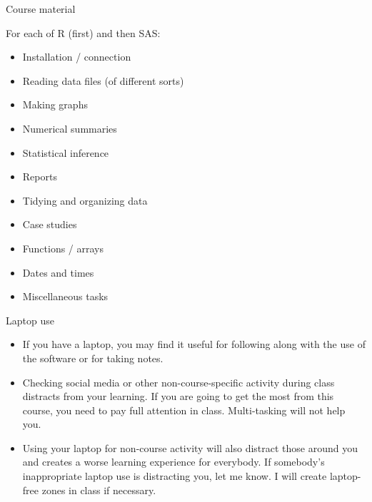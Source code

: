 \documentclass[ignorenonframetext,]{beamer}
\providecommand{\tightlist}{%
  \setlength{\itemsep}{0pt}\setlength{\parskip}{0pt}}
\begin{document}
\begin{frame}{Course material}
\protect\hypertarget{course-material}{}

For each of R (first) and then SAS:

\begin{itemize}
\tightlist
\item
  Installation / connection
\item
  Reading data files (of different sorts)
\item
  Making graphs
\item
  Numerical summaries
\item
  Statistical inference
\item
  Reports
\item
  Tidying and organizing data
\item
  Case studies
\item
  Functions / arrays
\item
  Dates and times
\item
  Miscellaneous tasks
\end{itemize}

\end{frame}

\begin{frame}{Laptop use}
\protect\hypertarget{laptop-use}{}

\begin{itemize}
\tightlist
\item
  If you have a laptop, you may find it useful for following along with
  the use of the software or for taking notes.
\item
  Checking social media or other non-course-specific activity during
  class distracts from your learning. If you are going to get the most
  from this course, you need to pay full attention in class.
  Multi-tasking will not help you.
\item
  Using your laptop for non-course activity will also distract those
  around you and creates a worse learning experience for everybody. If
  somebody's inappropriate laptop use is distracting you, let me know. I
  will create laptop-free zones in class if necessary.
\end{itemize}

\end{frame}
\end{document}
